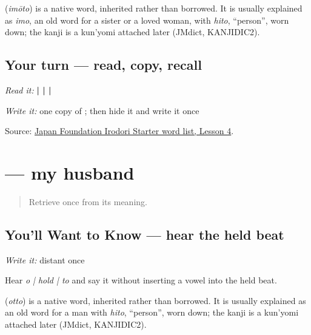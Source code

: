 \begin{cousinweb}
\textbf{} (\emph{imōto}) is a native word, inherited rather than borrowed. It is usually explained as \emph{imo}, an old word for a sister or a loved woman, with \emph{hito}, \textquotedblleft{}person\textquotedblright{}, worn down; the kanji is a kun'yomi attached later (JMdict, KANJIDIC2).
\end{cousinweb}

\subsection*{Your turn — read, copy, recall}
\emph{Read it:} \textbf{ |  |  | }

\emph{Write it:} one copy of \textbf{}; then hide it and write it once

\begin{tcolorbox}[breakable,colback=teal!4,colframe=teal!35!black,title={Before you move on}]
Source: \href{https://www.irodori.jpf.go.jp/assets/data/wordlist\_X.pdf}{Japan Foundation Irodori Starter word list, Lesson 4}.
\end{tcolorbox}
\section[\texorpdfstring{\ja{おっと} (otto)}{おっと (otto)}]{ — my husband}

\label{lesson:JA-C13-otto}



\begin{quote}
Retrieve \textbf{} once from its meaning.
\end{quote}

\subsection*{You'll Want to Know — hear the held beat}
\emph{Write it:} distant \textbf{} once

Hear \emph{o | hold | to} and say it without inserting a vowel into the held beat.

\begin{cousinweb}
\textbf{} (\emph{otto}) is a native word, inherited rather than borrowed. It is usually explained as an old word for a man with \emph{hito}, \textquotedblleft{}person\textquotedblright{}, worn down; the kanji is a kun'yomi attached later (JMdict, KANJIDIC2).
\end{cousinweb}

